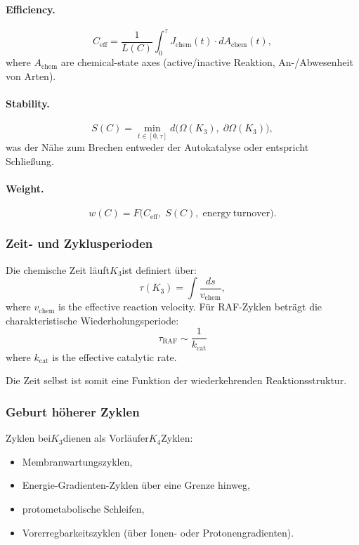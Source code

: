\paragraph{Efficiency.}
\[
  C_{\mathrm{eff}}
   = \frac{1}{L(C)}
     \int_0^\tau J_{\mathrm{chem}}(t)\cdot dA_{\mathrm{chem}}(t),
\]
where $A_{\mathrm{chem}}$ are chemical-state axes (active/inactive
Reaktion, An-/Abwesenheit von Arten).

\paragraph{Stability.}
\[
  S(C) = \min_{t\in[0,\tau]}
         d\bigl(
           \Omega(K_3),\;
           \partial\Omega(K_3)
         \bigr),
\]
was der Nähe zum Brechen entweder der Autokatalyse oder entspricht
Schließung.

\paragraph{Weight.}
\[
  w(C) = F\bigl(
           C_{\mathrm{eff}},\;
           S(C),\;
           \mathrm{energy\ turnover}
         \bigr).
\]

\subsubsection{Zeit- und Zyklusperioden}

Die chemische Zeit läuft$K_3$ist definiert über:
\[
  \tau(K_3) = \int \frac{ds}{v_{\mathrm{chem}}},
\]
where $v_{\mathrm{chem}}$ is the effective reaction velocity.
Für RAF-Zyklen beträgt die charakteristische Wiederholungsperiode:
\[
  \tau_{\mathrm{RAF}}
  \sim \frac{1}{k_{\mathrm{cat}}}
\]
where $k_{\mathrm{cat}}$ is the effective catalytic rate.

Die Zeit selbst ist somit eine Funktion der wiederkehrenden Reaktionsstruktur.

\subsubsection{Geburt höherer Zyklen}

Zyklen bei$K_3$dienen als Vorläufer$K_4$Zyklen:

\begin{itemize}
  \item Membranwartungszyklen,
  \item Energie-Gradienten-Zyklen über eine Grenze hinweg,
  \item protometabolische Schleifen,
  \item Vorerregbarkeitszyklen (über Ionen- oder Protonengradienten).
\end{itemize}

